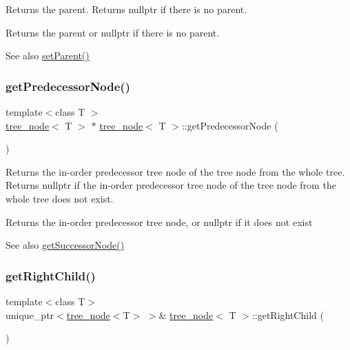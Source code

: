 Returns the parent. Returns nullptr if there is no parent. \begin{DoxyReturn}{Returns}
the parent or nullptr if there is no parent. 
\end{DoxyReturn}
\begin{DoxySeeAlso}{See also}
\hyperlink{classtree__node_a1fe75baae3a5d9caa9cb886c54c291e2}{set\+Parent()} 
\end{DoxySeeAlso}
\mbox{\label{classtree__node_a5cce6c37b00a6d899e371c334559310e}} 
\subsubsection{\texorpdfstring{get\+Predecessor\+Node()}{getPredecessorNode()}}
{\footnotesize\ttfamily template$<$class T $>$ \\
\hyperlink{classtree__node}{tree\+\_\+node}$<$ T $>$ $\ast$ \hyperlink{classtree__node}{tree\+\_\+node}$<$ T $>$\+::get\+Predecessor\+Node (\begin{DoxyParamCaption}{ }\end{DoxyParamCaption})}

Returns the in-\/order predecessor tree node of the tree node from the whole tree. Returns nullptr if the in-\/order predecessor tree node of the tree node from the whole tree does not exist. \begin{DoxyReturn}{Returns}
the in-\/order predecessor tree node, or nullptr if it does not exist 
\end{DoxyReturn}
\begin{DoxySeeAlso}{See also}
\hyperlink{classtree__node_a666b33dc3b2f3e2d2e4815cc4ec8b131}{get\+Successor\+Node()} 
\end{DoxySeeAlso}
\mbox{\label{classtree__node_a5e584d47f2c11941fe0406836fe50159}} 
\subsubsection{\texorpdfstring{get\+Right\+Child()}{getRightChild()}}
{\footnotesize\ttfamily template$<$class T$>$ \\
unique\+\_\+ptr$<$\hyperlink{classtree__node}{tree\+\_\+node}$<$T$>$ $>$\& \hyperlink{classtree__node}{tree\+\_\+node}$<$ T $>$\+::get\+Right\+Child (\begin{DoxyParamCaption}{ }\end{DoxyParamCaption})\hspace{0.3cm}{\ttfamily [inline]}}

